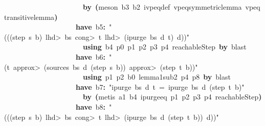 \documentclass{article}
\newcommand{\syntaxKEYWORDA}[1]{\textcolor[rgb]{0.0,0.4,0.6}{\textbf{#1}}}
\newcommand{\syntaxLITERALA}[1]{\textcolor[rgb]{1.0,0.0,0.8}{#1}}
\newcommand{\syntaxOPERATOR}[1]{\textcolor[rgb]{0.0,0.0,0.0}{\textbf{#1}}}
\newcommand{\syntaxKEYWORDA}[1]{\textcolor[rgb]{0.0,0.4,0.6}{\textbf{#1}}}
\newcommand{\syntaxLITERALA}[1]{\textcolor[rgb]{1.0,0.0,0.8}{#1}}
\newcommand{\syntaxOPERATOR}[1]{\textcolor[rgb]{0.0,0.0,0.0}{\textbf{#1}}}
\newcommand{\syntaxKEYWORDA}[1]{\textcolor[rgb]{0.0,0.4,0.6}{\textbf{#1}}}
\newcommand{\syntaxLITERALA}[1]{\textcolor[rgb]{1.0,0.0,0.8}{#1}}
\newcommand{\syntaxOPERATOR}[1]{\textcolor[rgb]{0.0,0.0,0.0}{\textbf{#1}}}
\newcommand{\syntaxKEYWORDA}[1]{\textcolor[rgb]{0.0,0.4,0.6}{#1}}
\newcommand{\syntaxLITERALA}[1]{\textcolor[rgb]{1.0,0.0,0.8}{\textbf{#1}}}
\newcommand{\syntaxOPERATOR}[1]{\textcolor[rgb]{0.0,0.0,0.0}{#1}}
\newcommand{\syntaxKEYWORDA}[1]{\textcolor[rgb]{0.0,0.4,0.6}{\textbf{#1}}}
\newcommand{\syntaxLITERALA}[1]{\textcolor[rgb]{1.0,0.0,0.8}{#1}}
\newcommand{\syntaxOPERATOR}[1]{\textcolor[rgb]{0.0,0.0,0.0}{\textbf{#1}}}
\newcommand{\syntaxKEYWORDA}[1]{\textcolor[rgb]{0.0,0.4,0.6}{\textbf{#1}}}
\newcommand{\syntaxLITERALA}[1]{\textcolor[rgb]{1.0,0.0,0.8}{#1}}
\newcommand{\syntaxOPERATOR}[1]{\textcolor[rgb]{0.0,0.0,0.0}{\textbf{#1}}}
\begin{document}
{\ }{\ }{\ }{\ }{\ }{\ }{\ }{\ }{\ }{\ }{\ }{\ }{\ }{\ }{\ }{\ }{\ }{\ }{\ }{\ }{\ }{\ }\syntaxKEYWORDA{by}{\ }\syntaxOPERATOR{(}meson{\ }b3{\ }b2{\ }ivpeq\usebox{\underscorebox}def{\ }vpeq\usebox{\underscorebox}symmetric\usebox{\underscorebox}lemma{\ }vpeq\usebox{\underscorebox}transitive\usebox{\underscorebox}lemma\syntaxOPERATOR{)}\hspace*{\fill}\\
{\ }{\ }{\ }{\ }{\ }{\ }{\ }{\ }{\ }{\ }{\ }{\ }{\ }{\ }{\ }{\ }{\ }{\ }{\ }{\ }\syntaxKEYWORDA{have}{\ }b5\syntaxOPERATOR{:}{\ }\syntaxLITERALA{"(((step{\ }s{\ }b){\ }\<lhd>{\ }bs{\ }\<cong>{\ }t{\ }\<lhd>{\ }(ipurge{\ }bs{\ }d{\ }t){\ }\usebox{\atbox}{\ }d))"}\hspace*{\fill}\\
{\ }{\ }{\ }{\ }{\ }{\ }{\ }{\ }{\ }{\ }{\ }{\ }{\ }{\ }{\ }{\ }{\ }{\ }{\ }{\ }{\ }{\ }\syntaxKEYWORDA{using}{\ }b4{\ }p0{\ }p1{\ }p2{\ }p3{\ }p4{\ }reachableStep{\ }\syntaxKEYWORDA{by}{\ }blast\hspace*{\fill}\\
{\ }{\ }{\ }{\ }{\ }{\ }{\ }{\ }{\ }{\ }{\ }{\ }{\ }{\ }{\ }{\ }{\ }{\ }{\ }{\ }\syntaxKEYWORDA{have}{\ }b6\syntaxOPERATOR{:}{\ }\syntaxLITERALA{"(t{\ }\<approx>{\ }(sources{\ }bs{\ }d{\ }(step{\ }s{\ }b)){\ }\<approx>{\ }(step{\ }t{\ }b))"}\hspace*{\fill}\\
{\ }{\ }{\ }{\ }{\ }{\ }{\ }{\ }{\ }{\ }{\ }{\ }{\ }{\ }{\ }{\ }{\ }{\ }{\ }{\ }{\ }{\ }\syntaxKEYWORDA{using}{\ }p1{\ }p2{\ }b0{\ }lemma\usebox{\underscorebox}1\usebox{\underscorebox}sub\usebox{\underscorebox}2{\ }p4{\ }p8{\ }\syntaxKEYWORDA{by}{\ }blast\hspace*{\fill}\\
{\ }{\ }{\ }{\ }{\ }{\ }{\ }{\ }{\ }{\ }{\ }{\ }{\ }{\ }{\ }{\ }{\ }{\ }{\ }{\ }\syntaxKEYWORDA{have}{\ }b7\syntaxOPERATOR{:}{\ }\syntaxLITERALA{"ipurge{\ }bs{\ }d{\ }t{\ }={\ }ipurge{\ }bs{\ }d{\ }(step{\ }t{\ }b)"}\hspace*{\fill}\\
{\ }{\ }{\ }{\ }{\ }{\ }{\ }{\ }{\ }{\ }{\ }{\ }{\ }{\ }{\ }{\ }{\ }{\ }{\ }{\ }{\ }{\ }\syntaxKEYWORDA{by}{\ }\syntaxOPERATOR{(}metis{\ }a1{\ }b4{\ }ipurge\usebox{\underscorebox}eq{\ }p1{\ }p2{\ }p3{\ }p4{\ }reachableStep\syntaxOPERATOR{)}\hspace*{\fill}\\
{\ }{\ }{\ }{\ }{\ }{\ }{\ }{\ }{\ }{\ }{\ }{\ }{\ }{\ }{\ }{\ }{\ }{\ }{\ }{\ }\syntaxKEYWORDA{have}{\ }b8\syntaxOPERATOR{:}{\ }\syntaxLITERALA{"(((step{\ }s{\ }b){\ }\<lhd>{\ }bs{\ }\<cong>{\ }t{\ }\<lhd>{\ }(ipurge{\ }bs{\ }d{\ }(step{\ }t{\ }b)){\ }\usebox{\atbox}{\ }d))"}\hspace*{\fill}\\
\end{document}

